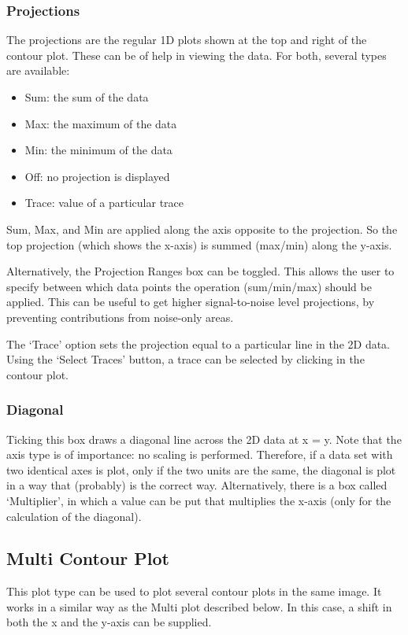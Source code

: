 \documentclass[11pt,a4paper]{article}
\begin{document}
\subsubsection*{Projections}
The projections are the regular 1D plots shown at the top and right of the contour plot. These can be of help in viewing the data.
For both, several types are available:
\begin{itemize}
  \item Sum: the sum of the data
  \item Max: the maximum of the data
  \item Min: the minimum of the data
  \item Off: no projection is displayed
  \item Trace: value of a particular trace
\end{itemize}
Sum, Max, and Min are applied along the axis opposite to the projection. So the top projection
(which shows the x-axis) is summed (max/min) along the y-axis.

Alternatively, the Projection Ranges box can be toggled. This allows the user to specify between
which data points the operation (sum/min/max) should be applied.  This can be useful to get higher
signal-to-noise level projections, by preventing contributions from noise-only areas.

The `Trace' option sets the projection equal to a particular line in the 2D data. Using the `Select
Traces' button, a trace can be selected by clicking in the contour plot.

\subsubsection*{Diagonal}
Ticking this box draws a diagonal line across the 2D data at x = y. Note that the axis type is of importance: no scaling is performed.
Therefore, if a data set with two identical axes is plot, only if the two units are the same, the diagonal is plot in a way that (probably) is the correct way.
Alternatively, there is a box called `Multiplier', in which a value can be put that multiplies the x-axis (only for the calculation of the diagonal).

\subsection{Multi Contour Plot}
This plot type can be used to plot several contour plots in the same image. It works in a similar way as the Multi plot described below. In this case, a shift in both the x and the y-axis can be supplied.
\end{document}
